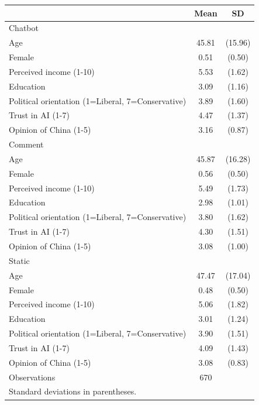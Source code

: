 \begin{tabular}{l*{1}{cc}}
\toprule
                    &        Mean&          SD\\
\midrule
Chatbot             &            &            \\
Age                 &       45.81&     (15.96)\\
Female              &        0.51&      (0.50)\\
Perceived income (1-10)&        5.53&      (1.62)\\
Education           &        3.09&      (1.16)\\
Political orientation (1=Liberal, 7=Conservative)&        3.89&      (1.60)\\
Trust in AI (1-7)   &        4.47&      (1.37)\\
Opinion of China (1-5)&        3.16&      (0.87)\\
\midrule
Comment             &            &            \\
Age                 &       45.87&     (16.28)\\
Female              &        0.56&      (0.50)\\
Perceived income (1-10)&        5.49&      (1.73)\\
Education           &        2.98&      (1.01)\\
Political orientation (1=Liberal, 7=Conservative)&        3.80&      (1.62)\\
Trust in AI (1-7)   &        4.30&      (1.51)\\
Opinion of China (1-5)&        3.08&      (1.00)\\
\midrule
Static              &            &            \\
Age                 &       47.47&     (17.04)\\
Female              &        0.48&      (0.50)\\
Perceived income (1-10)&        5.06&      (1.82)\\
Education           &        3.01&      (1.24)\\
Political orientation (1=Liberal, 7=Conservative)&        3.90&      (1.51)\\
Trust in AI (1-7)   &        4.09&      (1.43)\\
Opinion of China (1-5)&        3.08&      (0.83)\\
\midrule
Observations        &         670&            \\
\bottomrule
\multicolumn{3}{l}{\footnotesize Standard deviations in parentheses.}\\
\end{tabular}
